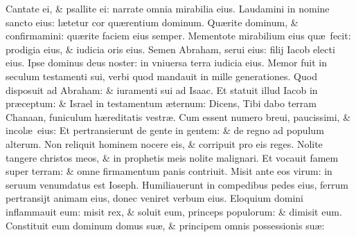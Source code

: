 \documentclass[a5paper,10pt]{book}
\def\ae{æ}
\begin{document}
\begin{multicols*}{2}
\newline \color{red} C\color{black}antate ei, \& psallite ei: narrate omnia mirabilia eius.
\newline \color{red} L\color{black}audamini in nomine sancto eius: l\ae tetur cor qu\ae rentium dominum.
\newline \color{red} Q\color{black}u\ae rite dominum, \& confirmamini: qu\ae rite faciem eius semper.
\newline \color{red} M\color{black}ementote mirabilium eius qu\ae \ fecit: prodigia eius, \& iudicia oris eius.
\newline \color{red} S\color{black}emen Abraham, serui eius: filij Iacob electi eius.
\newline \color{red} I\color{black}pse dominus deus noster: in vniuersa terra iudicia eius.
\newline \color{red} M\color{black}emor fuit in seculum testamenti sui, verbi quod mandauit in mille generationes.
\newline \color{red} Q\color{black}uod disposuit ad Abraham: \& iuramenti sui ad Isaac.
\newline \color{red} E\color{black}t statuit illud Iacob in pr\ae ceptum: \& Israel in testamentum \ae ternum:
\newline \color{red} D\color{black}icens, Tibi dabo terram Chanaan, funiculum h\ae reditatis vestr\ae .
\newline \color{red} C\color{black}um essent numero breui, paucissimi, \& incol\ae \ eius:
\newline \color{red} E\color{black}t pertransierunt de gente in gentem: \& de regno ad populum alterum.
\newline \color{red} N\color{black}on reliquit hominem nocere eis, \& corripuit pro eis reges.
\newline \color{red} N\color{black}olite tangere christos meos, \& in prophetis meis nolite malignari.
\newline \color{red} E\color{black}t vocauit famem super terram: \& omne firmamentum panis contriuit.
\newline \color{red} M\color{black}isit ante eos virum: in seruum venumdatus est Ioseph.
\newline \color{red} H\color{black}umiliauerunt in compedibus pedes eius, ferrum pertransijt animam eius, donec veniret verbum eius.
\newline \color{red} E\color{black}loquium domini inflammauit eum: misit rex, \& soluit eum, princeps populorum: \& dimisit eum.
\newline \color{red} C\color{black}onstituit eum dominum domus su\ae , \& principem omnis possessionis su\ae :

\end{multicols*}
\end{document}
